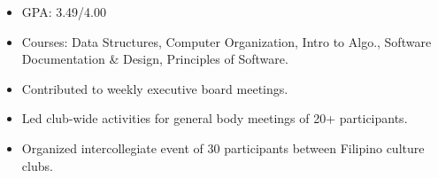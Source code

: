 






\begin{itemize}
\item GPA: 3.49/4.00
\item Courses: Data Structures, Computer Organization, Intro to Algo., Software Documentation \& Design, Principles of Software.
\end{itemize}


\begin{itemize}
\item Contributed to weekly executive board meetings.
\item Led club-wide activities for general body meetings of 20+ participants.
\item Organized intercollegiate event of 30 participants between Filipino culture clubs.
\end{itemize}



